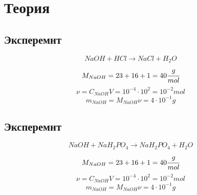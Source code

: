 \documentclass[a4paper]{article}
\numberwithin{equation}{section}
\begin{document}
\section{Теория}
\subsection{Эксперемнт}
\begin{equation} 
    NaOH + HCl \to NaCl + H_2O 
\end{equation} 
\begin{equation*} 
    M_{NaOH} = 23 + 16 + 1 = 40 \cfrac{g}{mol}
\end{equation*} 
\begin{equation*} 
    \nu = C_{NaOH} V = 10^{ - 4} \cdot 10^2 = 10^{ - 2} mol
\end{equation*} 
\begin{equation} 
    m_{NaOH} = M_{NaOH} \nu = 4 \cdot 10^{ - 1} g
\end{equation}  

\subsection{Эксперемнт}
\begin{equation} 
    NaOH + NaH_2PO_4 \to NaH_2PO_4 + H_2 O
\end{equation} 
\begin{equation*} 
    M_{NaOH} = 23 + 16 + 1 = 40 \cfrac{g}{mol}
\end{equation*} 
\begin{equation*} 
    \nu = C_{NaOH} V = 10^{ - 4} \cdot 10^2 = 10^{ - 2} mol
\end{equation*} 
\begin{equation} 
    m_{NaOH} = M_{NaOH} \nu = 4 \cdot 10^{ - 1} g
\end{equation} 
\end{document}
